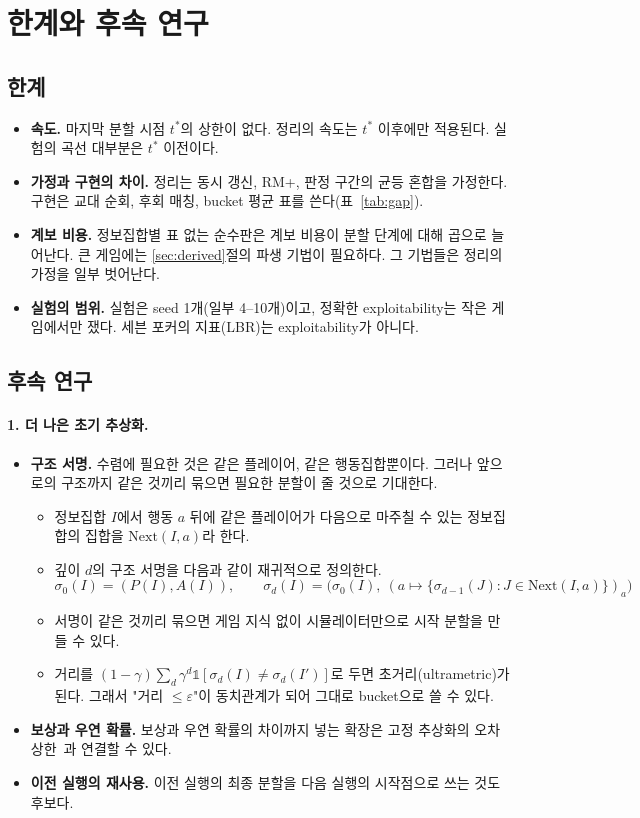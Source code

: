 \section{한계와 후속 연구}\label{sec:future}

\subsection{한계}
\begin{itemize}
  \item \textbf{속도.} 마지막 분할 시점 $t^*$의 상한이 없다. 정리의 속도는 $t^*$ 이후에만 적용된다. 실험의 곡선 대부분은 $t^*$ 이전이다.
  \item \textbf{가정과 구현의 차이.} 정리는 동시 갱신, RM+, 판정 구간의 균등 혼합을 가정한다. 구현은 교대 순회, 후회 매칭, bucket 평균 표를 쓴다(표~\ref{tab:gap}).
  \item \textbf{계보 비용.} 정보집합별 표 없는 순수판은 계보 비용이 분할 단계에 대해 곱으로 늘어난다. 큰 게임에는 \ref{sec:derived}절의 파생 기법이 필요하다. 그 기법들은 정리의 가정을 일부 벗어난다.
  \item \textbf{실험의 범위.} 실험은 seed 1개(일부 4–10개)이고, 정확한 exploitability는 작은 게임에서만 쟀다. 세븐 포커의 지표(LBR)는 exploitability가 아니다.
\end{itemize}

\subsection{후속 연구}
\paragraph{1. 더 나은 초기 추상화.}
\begin{itemize}
  \item \textbf{구조 서명.} 수렴에 필요한 것은 같은 플레이어, 같은 행동집합뿐이다. 그러나 앞으로의 구조까지 같은 것끼리 묶으면 필요한 분할이 줄 것으로 기대한다.
    \begin{itemize}
      \item 정보집합 $I$에서 행동 $a$ 뒤에 같은 플레이어가 다음으로 마주칠 수 있는 정보집합의 집합을 $\mathrm{Next}(I,a)$라 한다.
      \item 깊이 $d$의 구조 서명을 다음과 같이 재귀적으로 정의한다.
        \[
        \sigma_0(I)=(P(I),A(I)),\qquad\sigma_d(I)=\big(\sigma_0(I),\ (a\mapsto\{\sigma_{d-1}(J):J\in\mathrm{Next}(I,a)\})_{a}\big)
        \]
      \item 서명이 같은 것끼리 묶으면 게임 지식 없이 시뮬레이터만으로 시작 분할을 만들 수 있다.
      \item 거리를 $(1-\gamma)\sum_d\gamma^d\mathbb 1[\sigma_d(I)\ne\sigma_d(I')]$로 두면 초거리(ultrametric)가 된다. 그래서 "거리 $\le\varepsilon$"이 동치관계가 되어 그대로 bucket으로 쓸 수 있다.
    \end{itemize}
  \item \textbf{보상과 우연 확률.} 보상과 우연 확률의 차이까지 넣는 확장은 고정 추상화의 오차 상한~\citep{kroer2016imperfect,kroer2018unified}과 연결할 수 있다.
  \item \textbf{이전 실행의 재사용.} 이전 실행의 최종 분할을 다음 실행의 시작점으로 쓰는 것도 후보다.
\end{itemize}

